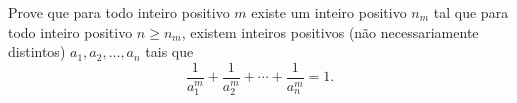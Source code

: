 Prove que para todo inteiro positivo $m$ existe um inteiro positivo $n_m$ tal que para todo inteiro positivo $n \ge n_m$, existem inteiros positivos (não necessariamente distintos) $a_1, a_2, \dots, a_n$ tais que
\[ \frac{1}{a_1^m} + \frac{1}{a_2^m} + \cdots + \frac{1}{a_n^m} = 1. \]

